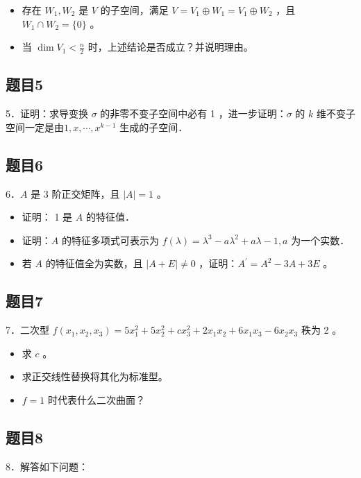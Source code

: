 \documentclass{article}
\begin{document}
\begin{itemize}
  \item[（1）] 存在 \(W_{1}, W_{2}\) 是 \(V\) 的子空间，满足 \(V=V_{1} \oplus W_{1}=V_{1} \oplus W_{2}\) ，且 \(W_{1} \cap W_{2}=\{0\}\) 。
  \item[（2）] 当 \(\operatorname{dim} V_{1}<\frac{n}{2}\) 时，上述结论是否成立？并说明理由。
\end{itemize}

\subsection{题目5}
5．证明：求导变换 \(\sigma\) 的非零不变子空间中必有 1 ，进一步证明：\(\sigma\) 的 \(k\) 维不变子空间一定是由\(1, x, \cdots, x^{k-1}\) 生成的子空间．

\subsection{题目6}
6．\(A\) 是 3 阶正交矩阵，且 \(|A|=1\) 。

\begin{itemize}
  \item[（1）] 证明： 1 是 \(A\) 的特征值．
  \item[（2）] 证明：\(A\) 的特征多项式可表示为 \(f(\lambda)=\lambda^{3}-a \lambda^{2}+a \lambda-1, a\) 为一个实数．
  \item[（3）] 若 \(A\) 的特征值全为实数，且 \(|A+E| \neq 0\) ，证明：\(A^{\prime}=A^{2}-3 A+3 E\) 。
\end{itemize}

\subsection{题目7}
7．二次型 \(f\left(x_{1}, x_{2}, x_{3}\right)=5 x_{1}^{2}+5 x_{2}^{2}+c x_{3}^{2}+2 x_{1} x_{2}+6 x_{1} x_{3}-6 x_{2} x_{3}\) 秩为 2 。

\begin{itemize}
  \item[（1）] 求 \(c\) 。
  \item[（2）] 求正交线性替换将其化为标准型。
  \item[（3）] \(f=1\) 时代表什么二次曲面？
\end{itemize}

\subsection{题目8}
8．解答如下问题：
\end{document}
